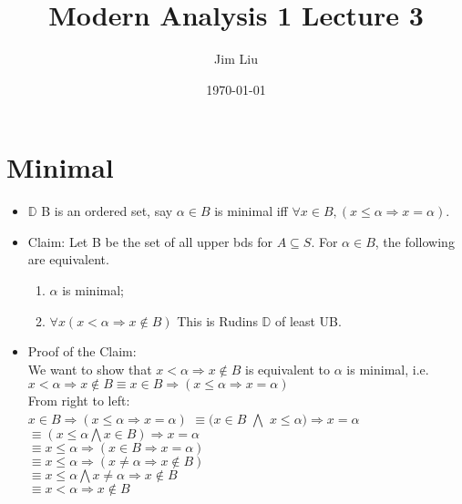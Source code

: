 \documentclass[11pt]{article}
\author{Jim Liu}
\date{\today}
\title{Modern Analysis 1 Lecture 3}
\begin{document}
\maketitle
\tableofcontents

\section{Minimal}
\label{sec:orgf8b4ae5}
\begin{itemize}
\item \(\mathbb{D}\) B is an ordered set, say \(\alpha \in B\) is minimal iff \(\forall x \in B, (x \leq \alpha \Rightarrow x = \alpha)\).
\item Claim: Let B be the set of all upper bds for \(A \subseteq S\). For \(\alpha \in B\), the following are equivalent.
\begin{enumerate}
\item \(\alpha\) is minimal;
\item \(\forall x (x < \alpha \Rightarrow x \notin B)\) This is Rudins \(\mathbb{D}\) of least UB.
\end{enumerate}
\item Proof of the Claim:\\[0pt]
We want to show that \(x < \alpha \Rightarrow x \notin B\) is equivalent to \(\alpha\) is minimal, i.e. \(x < \alpha \Rightarrow x \notin B \equiv x \in B \Rightarrow (x \leq \alpha \Rightarrow x = \alpha)\) \\[0pt]
From right to left:\\[0pt]
\(x \in B \Rightarrow (x \leq \alpha \Rightarrow x = \alpha)\)
\(\equiv (x \in B\) \(\bigwedge\) \(x \leq \alpha) \Rightarrow x = \alpha\) \\[0pt]
\(\equiv (x \leq \alpha \bigwedge x \in B) \Rightarrow x = \alpha\)\\[0pt]
\(\equiv x \leq \alpha \Rightarrow (x \in B \Rightarrow x = \alpha)\)\\[0pt]
\(\equiv x \leq \alpha \Rightarrow (x \neq \alpha \Rightarrow x \notin B )\)\\[0pt]
\(\equiv x \leq \alpha \bigwedge x \neq \alpha \Rightarrow x \notin B\)\\[0pt]
\(\equiv x < \alpha \Rightarrow x \notin B\)
\end{itemize}
\end{document}
